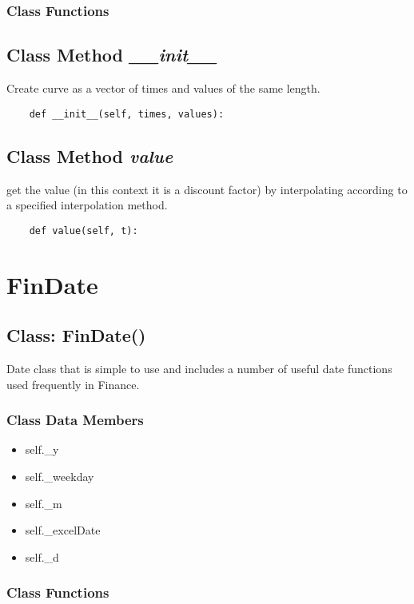 \documentclass[twoside,11pt]{book}
\begin{document}
\subsubsection{Class Functions}

\subsection{Class Method {\it \_\_init\_\_}}
Create curve as a vector of times and values of the same length. 

\begin{lstlisting}
    def __init__(self, times, values):
\end{lstlisting}

\subsection{Class Method {\it value}}
get the value (in this context it is a discount factor) by interpolating according to a specified interpolation method. 

\begin{lstlisting}
    def value(self, t):
\end{lstlisting}

\newpage
\section{FinDate}

\subsection{Class: FinDate()}
Date class that is simple to use and includes a number of useful date functions used frequently in Finance. 

\subsubsection{Class Data Members}
\begin{itemize}
\item{self.\_y}
\item{self.\_weekday}
\item{self.\_m}
\item{self.\_excelDate}
\item{self.\_d}
\end{itemize}

\subsubsection{Class Functions}
\end{document}
